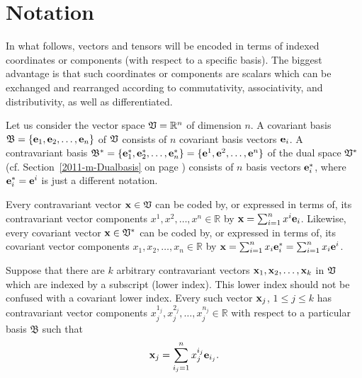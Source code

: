 \section{Notation}

In what follows, vectors and tensors will be encoded in terms of indexed coordinates or components
(with respect to a specific basis).
The biggest advantage is that such coordinates or components are scalars which can be
exchanged and rearranged according to commutativity, associativity, and distributivity,
as well as differentiated.

Let us consider
the vector space ${\frak V} = \mathbb{R}^n$ of dimension $n$.
A covariant basis
${\mathfrak B}=\{{\bf e}_1,{\bf e}_2,\ldots ,{\bf e}_n\}$ of ${\frak V}$
consists of
$n$ covariant basis vectors ${\bf e}_i$.
A contravariant basis
${\mathfrak B}^\ast =\{{\bf e}_1^\ast,{\bf e}_2^\ast,\ldots ,{\bf e}_n^\ast\}
= \{{\bf e}^1,{\bf e}^2,\ldots ,{\bf e}^n\}$ of the dual space ${\frak V}^\ast$
(cf. Section~\ref{2011-m-Dualbasis} on page \pageref{2011-m-Dualbasis})
consists of
$n$ basis vectors ${\bf e}_i^\ast$, where ${\bf e}_i^\ast = {\bf e}^i$ is just a different notation.

Every contravariant vector ${\bf x} \in {\frak V}$ can be coded by,  or expressed in terms of, its contravariant vector components
$x^1, x^2, \ldots , x^n \in \mathbb{R}$
by
${\bf x} =\sum_{i=1}^n x^{i} {\bf e}_{i}$.
Likewise, every covariant vector ${\bf x} \in {\frak V}^\ast$ can be coded by, or expressed in terms of, its covariant vector components
$x_1, x_2, \ldots , x_n \in \mathbb{R}$
by
${\bf x} =\sum_{i=1}^n x_{i} {\bf e}_{i}^\ast =\sum_{i=1}^n x_{i} {\bf e}^{i}$.

Suppose that there are $k$ arbitrary contravariant vectors ${\bf x}_1,{\bf x}_2,\ldots ,{\bf x}_k$ in ${\frak V}$ which are indexed by a subscript
(lower index). This lower index should not be confused with a covariant lower index.
Every such vector ${\bf x}_j$, $1 \le j \le k$ has contravariant vector components
$x^{1_j}_j, x^{2_j}_j, \ldots , x^{n_j}_j \in \mathbb{R}$
with respect to a particular basis ${\mathfrak B}$
such that
\begin{equation}
{\bf x}_j =\sum_{{i_j}=1}^n x^{i_j}_j{\bf e}_{{i_j}}.
\label{2016-m-tensor-contrvvs}
\end{equation}

